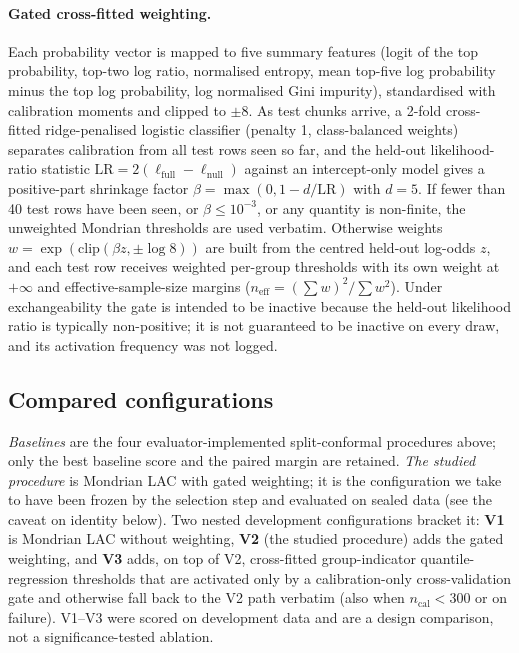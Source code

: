\documentclass{article}
\begin{document}
\paragraph{Gated cross-fitted weighting.}
Each probability vector is mapped to five summary features (logit of the top probability, top-two log ratio, normalised entropy, mean top-five log probability minus the top log probability, log normalised Gini impurity), standardised with calibration moments and clipped to $\pm8$. As test chunks arrive, a 2-fold cross-fitted ridge-penalised logistic classifier (penalty 1, class-balanced weights) separates calibration from all test rows seen so far, and the held-out likelihood-ratio statistic $\mathrm{LR}=2(\ell_{\mathrm{full}}-\ell_{\mathrm{null}})$ against an intercept-only model gives a positive-part shrinkage factor $\beta=\max(0,1-d/\mathrm{LR})$ with $d=5$. If fewer than 40 test rows have been seen, or $\beta\le10^{-3}$, or any quantity is non-finite, the unweighted Mondrian thresholds are used verbatim. Otherwise weights $w=\exp(\mathrm{clip}(\beta z,\pm\log 8))$ are built from the centred held-out log-odds $z$, and each test row receives weighted per-group thresholds with its own weight at $+\infty$ and effective-sample-size margins ($n_{\mathrm{eff}}=(\sum w)^2/\sum w^2$). Under exchangeability the gate is intended to be inactive because the held-out likelihood ratio is typically non-positive; it is not guaranteed to be inactive on every draw, and its activation frequency was not logged.

\subsection{Compared configurations}
\emph{Baselines} are the four evaluator-implemented split-conformal procedures above; only the best baseline score and the paired margin are retained. \emph{The studied procedure} is Mondrian LAC with gated weighting; it is the configuration we take to have been frozen by the selection step and evaluated on sealed data (see the caveat on identity below). Two nested development configurations bracket it: \textbf{V1} is Mondrian LAC without weighting, \textbf{V2} (the studied procedure) adds the gated weighting, and \textbf{V3} adds, on top of V2, cross-fitted group-indicator quantile-regression thresholds that are activated only by a calibration-only cross-validation gate and otherwise fall back to the V2 path verbatim (also when $n_{\mathrm{cal}}<300$ or on failure). V1--V3 were scored on development data and are a design comparison, not a significance-tested ablation.
\end{document}
